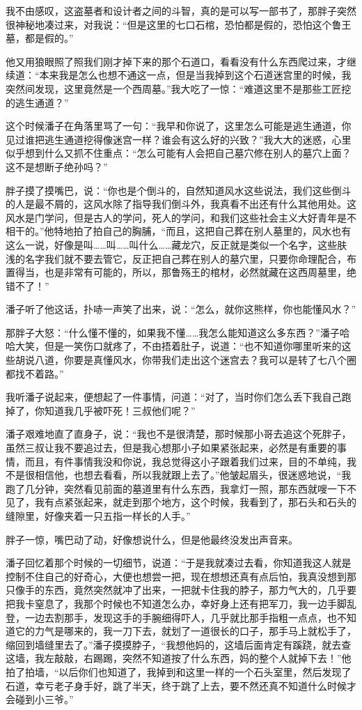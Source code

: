 我不由感叹，这盗墓者和设计者之间的斗智，真的是可以写一部书了，那胖子突然很神秘地凑过来，对我说：“但是这里的七口石棺，恐怕都是假的，恐怕这个鲁王墓，都是假的。”

他又用狼眼照了照我们刚才掉下来的那个石道口，看看没有什么东西爬过来，才继续道：“本来我是怎么也想不通这一点，但是当我掉到这个石道迷宫里的时候，我突然间发现，这里竟然是一个西周墓。”我大吃了一惊：“难道这里不是那些工匠挖的逃生通道？”

这个时候潘子在角落里骂了一句：“我早和你说了，这里怎么可能是逃生通道，你见过谁把逃生通道挖得像迷宫一样？谁会有这么好的兴致？”我大大的迷惑，心里似乎想到什么又抓不住重点：“怎么可能有人会把自己墓穴修在别人的墓穴上面？这不是想断子绝孙吗？”

胖子摸了摸嘴巴，说：“你也是个倒斗的，自然知道风水这些说法，我们这些倒斗的人是最不屑的，这风水除了指导我们倒斗外，我真看不出还有什么其他用处。这风水是门学问，但是古人的学问，死人的学问，和我们这些社会主义大好青年是不相干的。”他特地拍了拍自己的胸脯，“而且，这把自己葬在别人墓里的，风水也有这么一说，好像是叫……叫……叫什么……藏龙穴，反正就是类似一个名字，这些肤浅的名字我们就不要去管它，反正把自己葬在别人的墓穴里，只要你命理配合，布置得当，也是非常有可能的，所以，那鲁殇王的棺材，必然就藏在这西周墓里，绝错不了！”

潘子听了他这话，扑哧一声笑了出来，说：“怎么，就你这熊样，你也能懂风水？”

那胖子大怒：“什么懂不懂的，如果我不懂……我怎么能知道这么多东西？”潘子哈哈大笑，但是一笑伤口就疼了，不由捂着肚子，说道：“也不知道你哪里听来的这些胡说八道，你要是真懂风水，你带我们走出这个迷宫去？我可以是转了七八个圈都找不着路。”

我听潘子说起来，便想起了一件事情，问道：“对了，当时你们怎么丢下我自己跑掉了，你知道我几乎被吓死！三叔他们呢？”

潘子艰难地直了直身子，说：“我也不是很清楚，那时候那小哥去追这个死胖子，虽然三叔让我不要追过去，但是我心想那小子如果紧张起来，必然是有重要的事情，而且，有件事情我没和你说，我总觉得这小子跟着我们过来，目的不单纯，我不是很相信他，也想去看看，所以我就跟上去了。”他皱起眉头，很迷惑地说，“我跑了几分钟，突然看见前面的墓道里有什么东西，我拿灯一照，那东西就嗖一下不见了，我有点紧张起来，就走到那个地方，这个时候，我看到了，那石头和石头的缝隙里，好像夹着一只五指一样长的人手。”

胖子一惊，嘴巴动了动，好像想说什么，但是他最终没发出声音来。

潘子回忆着那个时候的一切细节，说道：“于是我就凑过去看，你知道我这人就是控制不住自己的好奇心，大便也想尝一把，现在想想还真有点后怕，我真没想到那只像手的东西，竟然突然就冲了出来，一把就卡住我的脖子，那力气大的，几乎要把我卡窒息了，我那个时候也不知道怎么办，幸好身上还有把军刀，我一边手脚乱登，一边去割那手，发现这手的手腕细得吓人，几乎就比那手指粗一点点，也不知道它的力气是哪来的，我一刀下去，就划了一道很长的口子，那手马上就松手了，缩回到墙缝里去了。”潘子摸摸脖子，“我想他妈的，这墙后面肯定有蹊跷，就去查这墙，我左敲敲，右踢踢，突然不知道按了什么东西，妈的整个人就掉下去！”他拍了拍墙，“以后你们也知道了，我掉到和这里一样的一个石头室里，然后发现了石道，幸亏老子身手好，跳了半天，终于跳了上去，要不然还真不知道什么时候才会碰到小三爷。”

